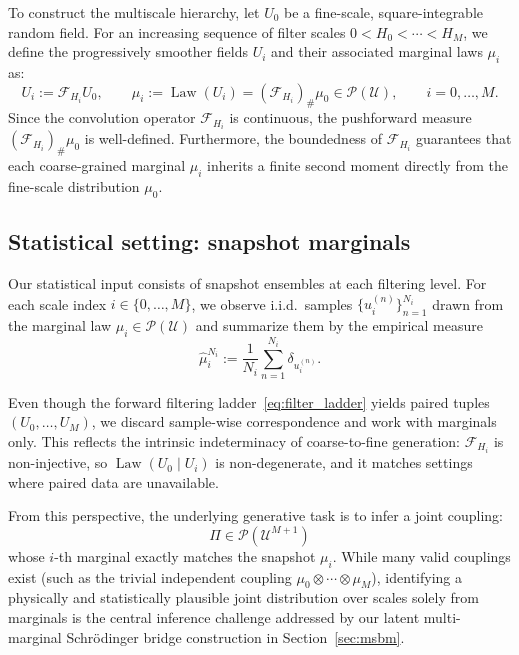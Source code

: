 \documentclass[review,onefignum,onetabnum]{siamart250211}
\newcommand{\Law}{\operatorname{Law}}
\newcommand{\1}{\mathbf{1}}
\newcommand{\cU}{\mathcal{U}}
\newcommand{\cP}{\mathcal{P}}
\newcommand{\cF}{\mathcal{F}}
\begin{document}
To construct the multiscale hierarchy, let $U_0$ be a fine-scale, square-integrable random field. For an increasing sequence of filter scales $0 < H_0 < \cdots < H_M$, we define the progressively smoother fields $U_i$ and their associated marginal laws $\mu_i$ as:
\begin{equation}
U_i := \cF_{H_i} U_0, \qquad \mu_i := \Law(U_i) = (\cF_{H_i})_\# \mu_0 \in \cP(\cU), \qquad i=0,\dots,M.
\label{eq:filter_ladder}
\end{equation}
Since the convolution operator $\cF_{H_i}$ is continuous, the pushforward measure $(\cF_{H_i})_\# \mu_0$ is well-defined. Furthermore, the boundedness of $\cF_{H_i}$ guarantees that each coarse-grained marginal $\mu_i$ inherits a finite second moment directly from the fine-scale distribution $\mu_0$.

\subsection{Statistical setting: snapshot marginals}\label{sec:stat_setting}
Our statistical input consists of snapshot ensembles at each filtering level. For each scale index $i \in \{0,\dots,M\}$, we observe i.i.d.\ samples $\{u_i^{(n)}\}_{n=1}^{N_i}$ drawn from the marginal law $\mu_i \in \cP(\cU)$ and summarize them by the empirical measure
\begin{equation}
\widehat\mu_i^{N_i} := \frac{1}{N_i}\sum_{n=1}^{N_i}\delta_{u_i^{(n)}}.
\label{eq:empirical_mu}
\end{equation}

Even though the forward filtering ladder~\eqref{eq:filter_ladder} yields paired tuples $(U_0,\dots,U_M)$, we discard sample-wise correspondence and work with marginals only. This reflects the intrinsic indeterminacy of coarse-to-fine generation: $\cF_{H_i}$ is non-injective, so $\Law(U_0 \mid U_i)$ is non-degenerate, and it matches settings where paired data are unavailable.

From this perspective, the underlying generative task is to infer a joint coupling:
\begin{equation}
\Pi \in \cP(\cU^{M+1})
\label{eq:joint_law}
\end{equation}
whose $i$-th marginal exactly matches the snapshot $\mu_i$. While many valid couplings exist (such as the trivial independent coupling $\mu_0\otimes\cdots\otimes\mu_M$), identifying a physically and statistically plausible joint distribution over scales solely from marginals is the central inference challenge addressed by our latent multi-marginal Schr\"odinger bridge construction in Section~\ref{sec:msbm}.
\end{document}
